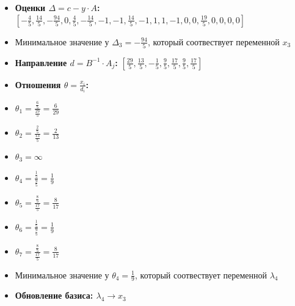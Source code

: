 \begin{itemize}
\begin{itemize}
$[1, 1, - \frac{14}{5}, 1, 1, 1, 1]$
\item \textbf{Оценки $\Delta = c - y \cdot A$:}
$[- \frac{4}{5}, \frac{14}{5}, - \frac{94}{5}, 0, \frac{4}{5}, - \frac{14}{5}, -1, -1, \frac{14}{5}, -1, 1, 1, -1, 0, 0, \frac{19}{5}, 0, 0, 0, 0]$
\item Минимальное значение у  $\Delta_{3} = - \frac{94}{5}$, который соотвествует переменной $x_3$
\item \textbf{Направление $d = B^{-1} \cdot A_j$:}
$[\frac{29}{5}, \frac{13}{5}, - \frac{1}{5}, \frac{9}{5}, \frac{17}{5}, \frac{9}{5}, \frac{17}{5}]$
\item \textbf{Отношения $\theta = \frac{x_i}{d_i}$:}
\item $\theta_{1} = \frac{\frac{6}{5}}{\frac{29}{5}} = \frac{6}{29}$
\item $\theta_{2} = \frac{\frac{2}{5}}{\frac{13}{5}} = \frac{2}{13}$
\item $\theta_{3} = \infty$
\item $\theta_{4} = \frac{\frac{1}{5}}{\frac{9}{5}} = \frac{1}{9}$
\item $\theta_{5} = \frac{\frac{8}{5}}{\frac{17}{5}} = \frac{8}{17}$
\item $\theta_{6} = \frac{\frac{1}{5}}{\frac{9}{5}} = \frac{1}{9}$
\item $\theta_{7} = \frac{\frac{8}{5}}{\frac{17}{5}} = \frac{8}{17}$
\item Минимальное значение у  $\theta_{4} = \frac{1}{9}$, который соотвествует переменной $\lambda_4$
\item \textbf{Обновление базиса: $\lambda_4 \rightarrow x_3$}
\end{itemize}
\newpage

\end{itemize}
